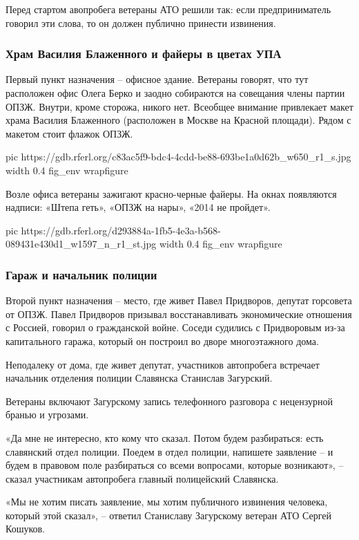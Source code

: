 Перед стартом авопробега ветераны АТО решили так: если предприниматель говорил
эти слова, то он должен публично принести извинения.

\subsubsection{Храм Василия Блаженного и файеры в цветах УПА}

Первый пункт назначения – офисное здание. Ветераны говорят, что тут расположен
офис Олега Берко и заодно собираются на совещания члены партии ОПЗЖ. Внутри,
кроме сторожа, никого нет. Всеобщее внимание привлекает макет храма Василия
Блаженного (расположен в Москве на Красной площади). Рядом с макетом стоит
флажок ОПЗЖ.

\ifcmt
pic https://gdb.rferl.org/c83ac5f9-bdc4-4cdd-be88-693be1a0d62b_w650_r1_s.jpg
width 0.4
fig_env wrapfigure
\fi

Возле офиса ветераны зажигают красно-черные файеры. На окнах появляются
надписи: «Штепа геть», «ОПЗЖ на нары», «2014 не пройдет».

\ifcmt
  pic https://gdb.rferl.org/d293884a-1fb5-4e3a-b568-089431e430d1_w1597_n_r1_st.jpg
	width 0.4
	fig_env wrapfigure
\fi

\subsubsection{Гараж и начальник полиции}

Второй пункт назначения – место, где живет Павел Придворов, депутат горсовета
от ОПЗЖ. Павел Придворов призывал восстанавливать экономические отношения с
Россией, говорил о гражданской войне. Соседи судились с Придворовым из-за
капитального гаража, который он построил во дворе многоэтажного дома.

Неподалеку от дома, где живет депутат, участников автопробега встречает
начальник отделения полиции Славянска Станислав Загурский.

Ветераны включают Загурскому запись телефонного разговора с нецензурной бранью
и угрозами.

«Да мне не интересно, кто кому что сказал. Потом будем разбираться: есть
славянский отдел полиции. Поедем в отдел полиции, напишете заявление – и будем
в правовом поле разбираться со всеми вопросами, которые возникают», – сказал
участникам автопробега главный полицейский Славянска.

«Мы не хотим писать заявление, мы хотим публичного извинения человека, который
этой сказал», – ответил Станиславу Загурскому ветеран АТО Сергей Кошуков.


